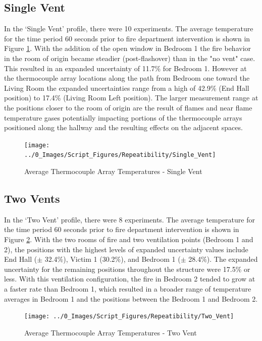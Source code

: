\documentclass[12pt,oneside]{book}
\begin{document}
\subsection{Single Vent}
In the `Single Vent' profile, there were 10 experiments. The average temperature for the time period 60 seconds prior to fire department intervention is shown in Figure \ref{fig:repeat_Single_Vent}.  With the addition of the open window in Bedroom 1 the fire behavior in the room of origin became steadier (post-flashover) than in the "no vent" case. This resulted in an expanded uncertainty of 11.7\% for Bedroom 1.  However at the thermocouple array locations along the path from Bedroom one toward the Living Room the expanded uncertainties range from a high of 42.9\% (End Hall position) to 17.4\% (Living Room Left position). The larger measurement range at the positions closer to the room of origin are the result of flames and near flame temperature gases potentially impacting portions of the thermocouple arrays positioned along the hallway and the resulting effects on the adjacent spaces.   


\begin{figure}[H]
\centering
\texttt{[image: ../0\_Images/Script\_Figures/Repeatibility/Single\_Vent]}
\caption{Average Thermocouple Array Temperatures - Single Vent}
\label{fig:repeat_Single_Vent}
\end{figure}

\subsection{Two Vents}
In the `Two Vent' profile, there were 8 experiments. The average temperature for the time period 60 seconds prior to fire department intervention is shown in Figure \ref{fig:repeat_Two_Vent}. With the two rooms of fire and two ventilation points (Bedroom 1 and 2), the positions with the highest levels of expanded uncertainty values include End Hall ($\pm$ 32.4\%), Victim 1 (30.2\%), and Bedroom 1 ($\pm$ 28.4\%). The expanded uncertainty for the remaining positions throughout the structure were 17.5\% or less.  With this ventilation configuration, the fire in Bedroom 2 tended to grow at a faster rate than Bedroom 1, which resulted in a broader range of temperature averages in Bedroom 1 and the positions between the Bedroom 1 and Bedroom 2.   

\begin{figure}[H]
\centering
\texttt{[image: ../0\_Images/Script\_Figures/Repeatibility/Two\_Vent]}
\caption{Average Thermocouple Array Temperatures - Two Vent}
\label{fig:repeat_Two_Vent}
\end{figure}
\end{document}
